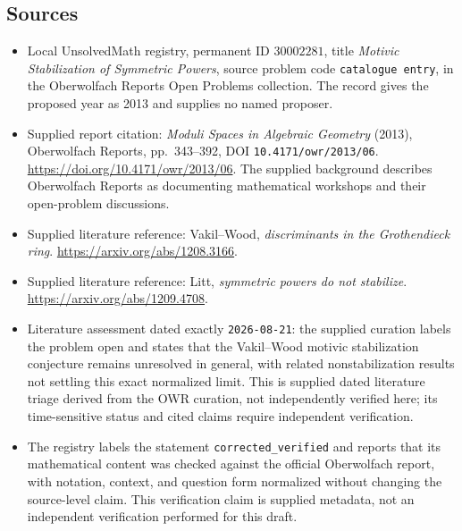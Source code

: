 \documentclass[11pt]{article}
\begin{document}
\subsection{Sources}
\begin{itemize}
\item Local UnsolvedMath registry, permanent ID \(30002281\), title \emph{Motivic Stabilization of Symmetric Powers}, source problem code \texttt{catalogue entry}, in the Oberwolfach Reports Open Problems collection. The record gives the proposed year as 2013 and supplies no named proposer.
\item Supplied report citation: \emph{Moduli Spaces in Algebraic Geometry} (2013), Oberwolfach Reports, pp.~343--392, DOI \texttt{10.4171/owr/2013/06}. \url{https://doi.org/10.4171/owr/2013/06}. The supplied background describes Oberwolfach Reports as documenting mathematical workshops and their open-problem discussions.
\item Supplied literature reference: Vakil--Wood, \emph{discriminants in the Grothendieck ring}. \url{https://arxiv.org/abs/1208.3166}.
\item Supplied literature reference: Litt, \emph{symmetric powers do not stabilize}. \url{https://arxiv.org/abs/1209.4708}.
\item Literature assessment dated exactly \texttt{2026-08-21}: the supplied curation labels the problem open and states that the Vakil--Wood motivic stabilization conjecture remains unresolved in general, with related nonstabilization results not settling this exact normalized limit. This is supplied dated literature triage derived from the OWR curation, not independently verified here; its time-sensitive status and cited claims require independent verification.
\item The registry labels the statement \texttt{corrected\_verified} and reports that its mathematical content was checked against the official Oberwolfach report, with notation, context, and question form normalized without changing the source-level claim. This verification claim is supplied metadata, not an independent verification performed for this draft.
\end{itemize}
\end{document}
